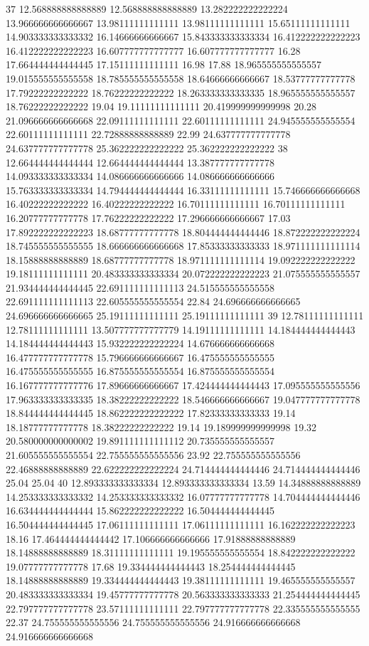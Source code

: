 37 12.568888888888889 12.568888888888889 13.282222222222224 13.966666666666667 13.98111111111111 13.98111111111111 15.65111111111111 14.903333333333332 16.14666666666667 15.843333333333334 16.412222222222223 16.412222222222223 16.607777777777777 16.607777777777777 16.28 17.664444444444445 17.15111111111111 16.98 17.88 18.965555555555557 19.015555555555558 18.785555555555558 18.64666666666667 18.53777777777778 17.79222222222222 18.76222222222222 18.263333333333335 18.965555555555557 18.76222222222222 19.04 19.11111111111111 20.419999999999998 20.28 21.096666666666668 22.09111111111111 22.60111111111111 24.945555555555554 22.60111111111111 22.72888888888889 22.99 24.637777777777778 24.637777777777778 25.362222222222222 25.362222222222222
38 12.664444444444444 12.664444444444444 13.387777777777778 14.093333333333334 14.086666666666666 14.086666666666666 15.763333333333334 14.794444444444444 16.33111111111111 15.746666666666668 16.40222222222222 16.40222222222222 16.70111111111111 16.70111111111111 16.20777777777778 17.76222222222222 17.296666666666667 17.03 17.892222222222223 18.68777777777778 18.804444444444446 18.872222222222224 18.745555555555555 18.666666666666668 17.85333333333333 18.971111111111114 18.15888888888889 18.68777777777778 18.971111111111114 19.092222222222222 19.18111111111111 20.483333333333334 20.072222222222223 21.075555555555557 21.934444444444445 22.691111111111113 24.515555555555558 22.691111111111113 22.605555555555554 22.84 24.696666666666665 24.696666666666665 25.19111111111111 25.19111111111111
39 12.78111111111111 12.78111111111111 13.507777777777779 14.19111111111111 14.184444444444443 14.184444444444443 15.932222222222224 14.676666666666668 16.477777777777778 15.796666666666667 16.475555555555555 16.475555555555555 16.875555555555554 16.875555555555554 16.167777777777776 17.89666666666667 17.424444444444443 17.095555555555556 17.963333333333335 18.38222222222222 18.546666666666667 19.047777777777778 18.844444444444445 18.862222222222222 17.82333333333333 19.14 18.18777777777778 18.38222222222222 19.14 19.189999999999998 19.32 20.580000000000002 19.891111111111112 20.735555555555557 21.605555555555554 22.755555555555556 23.92 22.755555555555556 22.46888888888889 22.622222222222224 24.714444444444446 24.714444444444446 25.04 25.04
40 12.893333333333334 12.893333333333334 13.59 14.34888888888889 14.253333333333332 14.253333333333332 16.07777777777778 14.704444444444446 16.634444444444444 15.862222222222222 16.504444444444445 16.504444444444445 17.06111111111111 17.06111111111111 16.162222222222223 18.16 17.464444444444442 17.106666666666666 17.91888888888889 18.14888888888889 18.31111111111111 19.195555555555554 18.842222222222222 19.07777777777778 17.68 19.334444444444443 18.254444444444445 18.14888888888889 19.334444444444443 19.38111111111111 19.465555555555557 20.483333333333334 19.45777777777778 20.563333333333333 21.254444444444445 22.797777777777778 23.57111111111111 22.797777777777778 22.335555555555555 22.37 24.755555555555556 24.755555555555556 24.916666666666668 24.916666666666668
